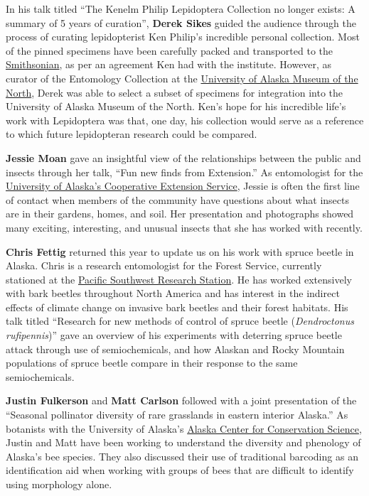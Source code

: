 In his talk titled ``The Kenelm Philip Lepidoptera Collection no longer exists: A summary of 5 years of curation'', \textbf{Derek Sikes} guided the audience through the process of curating lepidopterist Ken Philip’s incredible personal collection. Most of the pinned specimens have been carefully packed and transported to the \href{https://www.si.edu/}{Smithsonian}, as per an agreement Ken had with the institute. However, as curator of the Entomology Collection at the \href{https://www.uaf.edu/museum/}{University of Alaska Museum of the North}, Derek was able to select a subset of specimens for integration into the University of Alaska Museum of the North. Ken’s hope for his incredible life's work with Lepidoptera was that, one day, his collection would serve as a reference to which future lepidopteran research could be compared.

\textbf{Jessie Moan} gave an insightful view of the relationships between the public and insects through her talk, ``Fun new finds from Extension.'' As entomologist for the \href{https://www.uaf.edu/ces/}{University of Alaska’s Cooperative Extension Service}, Jessie is often the first line of contact when members of the community have questions about what insects are in their gardens, homes, and soil. Her presentation and photographs showed many exciting, interesting, and unusual insects that she has worked with recently. 
 
\textbf{Chris Fettig} returned this year to update us on his work with spruce beetle in Alaska. Chris is a research entomologist for the  Forest Service, currently stationed at the \href{https://www.fs.fed.us/psw/}{Pacific Southwest Research Station}. He has worked extensively with bark beetles throughout North America and has interest in the indirect effects of climate change on invasive bark beetles and their forest habitats. His talk titled ``Research for new methods of control of spruce beetle (\textit{Dendroctonus rufipennis})'' gave an overview of his experiments with deterring spruce beetle attack through use of semiochemicals, and how Alaskan and Rocky Mountain populations of spruce beetle compare in their response to the same semiochemicals.

\textbf{Justin Fulkerson} and \textbf{Matt Carlson} followed with a joint presentation of the ``Seasonal pollinator diversity of rare grasslands in eastern interior Alaska.'' As botanists with the University of Alaska’s \href{https://accs.uaa.alaska.edu/}{Alaska Center for Conservation Science}, Justin and Matt have been working to understand the diversity and phenology of Alaska’s bee species. They also discussed their use of traditional barcoding as an identification aid when working with groups of bees that are difficult to identify using morphology alone.

